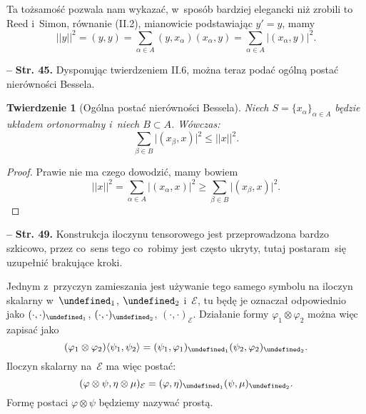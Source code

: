 \documentclass[a4paper,11pt]{article}
\newtheorem{twr}{Twierdzenie}
\newcommand{\mc}{\mathcal}
\newcommand{\al}{\alpha}
\newcommand{\be}{\beta}
\newcommand{\vp}{\varphi}
\let\H\undefined
\newcommand{\H}{\mc{H}}
\newcommand{\subs}{\subset}
\newcommand{\ot}{\otimes}
\newcommand{\Sum}{\sum\limits}
\newcommand{\lket}{\langle}
\newcommand{\rket}{\rangle}
\providecommand{\absj}[1]{\lvert #1 \rvert}
\newcommand{\norm}[1]{\left|\left| #1 \right|\right|}
\newcommand{\tb}{\textbf}
\newcommand{\noi}{\noindent}
\newcommand{\start}{\noi \tb{--} {}}
\newcommand{\Str}[1]{\tb{Str. #1.}}
\begin{document}
Ta tożsamość pozwala nam wykazać, w~sposób bardziej elegancki niż
zrobili to Reed i~Simon, równanie (II.2), mianowicie podstawiając
$y' = y$, mamy
\begin{equation*}
  \norm{ y }^{ 2 } = ( y, y ) = \Sum_{ \al \in A } ( y, x_{ \al } )
  ( x_{ \al }, y ) = \Sum_{ \al \in A } \absj{ ( x_{ \al }, y ) }^{ 2 }.
\end{equation*}

\start \Str{45} Dysponując twierdzeniem II.6, można teraz podać ogólną
postać nierówności Bessela.

\begin{twr}[Ogólna postać nierówności Bessela]
  Niech $S = \{ x_{ \al } \}_{ \al \in A }$ będzie układem
  ortonormalny i~niech $B \subs A$. Wówczas:
  \begin{equation*}
    \Sum_{ \be \in B } \absj{ ( x_{ \be }, x ) }^{ 2 } \leq \norm{ x }^{ 2 }.
  \end{equation*}
\end{twr}
\begin{proof}
  Prawie nie ma czego dowodzić, mamy bowiem
  \begin{equation*}
    \norm{ x }^{ 2 } = \Sum_{ \al \in A } \absj{ ( x_{ \al }, x ) }^{ 2 }
    \geq \Sum_{ \be \in B } \absj{ ( x_{ \be }, x ) }^{ 2 }.
  \end{equation*}
\end{proof}


\start \Str{49} Konstrukcja iloczynu tensorowego jest przeprowadzona
bardzo szkicowo, przez co~sens tego co~robimy jest często ukryty,
tutaj postaram~się uzupełnić brakujące kroki.

Jednym z~przyczyn zamieszania jest używanie tego samego symbolu na
iloczyn skalarny w~$\H_{ 1 }$, $\H_{ 2 }$ i~$\mc{E}$, tu będę je
oznaczał odpowiednio jako $( \cdot, \cdot )_{ \H_{ 1 } }$,
$( \cdot, \cdot )_{ \H_{ 2 } }$, $( \cdot, \cdot )_{ \mc{ E } }$.
Działanie formy $\vp_{ 1 } \ot \vp_{ 2 }$ można więc zapisać jako
\begin{displaymath}
  ( \vp_{ 1 } \ot \vp_{ 2 } )\lket \psi_{ 1 }, \psi_{ 2 } \rket
  = ( \psi_{ 1 }, \vp_{ 1 } )_{ \H_{ 1 } } ( \psi_{ 2 },
  \vp_{ 2 } )_{ \H_{ 2 } }.
\end{displaymath}
Iloczyn skalarny na~$\mc{E}$ ma więc postać:
\begin{displaymath}
  ( \vp \ot \psi, \eta \ot \mu )_{ \mc{E} } = ( \vp, \eta )_{ \H_{ 1 } }
  ( \psi, \mu )_{ \H_{ 2 } }.
\end{displaymath}
Formę postaci $\vp \ot \psi$ będziemy nazywać prostą.
\end{document}
